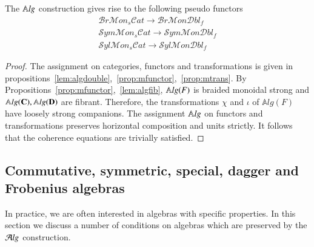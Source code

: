 

\begin{prop}\label{prop:funcAlg}
The $\mathbb{A}\mathit{lg}$ construction gives rise to the following pseudo functors
\begin{align*}
\mathcal{B}r\mathcal{M}on_s\mathcal{C}at \rightarrow \mathcal{B}r\mathcal{M}on\mathcal{D}bl_f\\
\mathcal{S}ym\mathcal{M}on_s\mathcal{C}at \rightarrow \mathcal{S}ym\mathcal{M}on\mathcal{D}bl_f\\
\mathcal{S}yl\mathcal{M}on_s\mathcal{C}at \rightarrow \mathcal{S}yl\mathcal{M}on\mathcal{D}bl_f
\end{align*}
\end{prop}

\begin{proof}
The assignment on categories, functors and transformations is given in propositions~\ref{lem:algdouble},~\ref{prop:mfunctor},~\ref{prop:mtrans}.
By Propositions~\ref{prop:mfunctor},~\ref{lem:algfib}, $\mathbb{A}\mathit{lg}(F)$ is braided monoidal strong and $\mathbb{A}\mathit{lg}({\bf C}),\mathbb{A}\mathit{lg}({\bf D})$ are fibrant. Therefore, the transformations $\chi$ and $\iota$ of $\mathbb{A}lg(F)$ have loosely strong companions. 
The assignment $\mathbb{A}\mathit{lg}$ on functors and transformations preserves horizontal composition and units strictly. It follows that the coherence equations are trivially satisfied.
\end{proof}


\subsection{Commutative, symmetric, special, dagger and Frobenius algebras}
In practice, we are often interested in algebras with specific properties. In this section we discuss a number of conditions on algebras which are preserved by the $\mathcal{A}\mathit{lg}$ construction.

